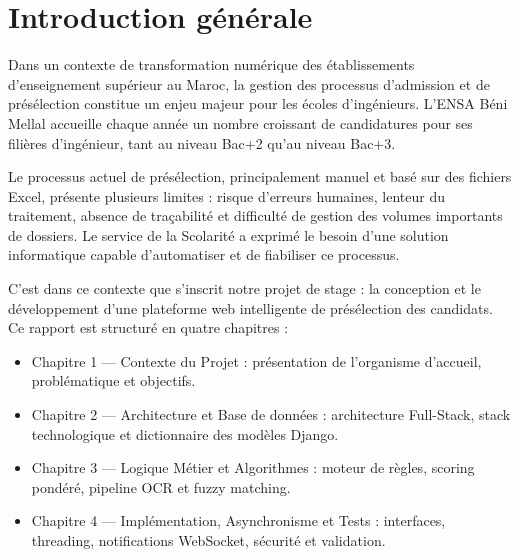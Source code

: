 \chapter*{Introduction générale}

Dans un contexte de transformation numérique des établissements d'enseignement supérieur au Maroc, la gestion des processus d'admission et de présélection constitue un enjeu majeur pour les écoles d'ingénieurs. L'ENSA Béni Mellal accueille chaque année un nombre croissant de candidatures pour ses filières d'ingénieur, tant au niveau Bac+2 qu'au niveau Bac+3.

Le processus actuel de présélection, principalement manuel et basé sur des fichiers Excel, présente plusieurs limites : risque d'erreurs humaines, lenteur du traitement, absence de traçabilité et difficulté de gestion des volumes importants de dossiers. Le service de la Scolarité a exprimé le besoin d'une solution informatique capable d'automatiser et de fiabiliser ce processus.

C'est dans ce contexte que s'inscrit notre projet de stage : la conception et le développement d'une plateforme web intelligente de présélection des candidats. Ce rapport est structuré en quatre chapitres :

\begin{itemize}
\item Chapitre 1 — Contexte du Projet : présentation de l'organisme d'accueil, problématique et objectifs.
\item Chapitre 2 — Architecture et Base de données : architecture Full-Stack, stack technologique et dictionnaire des modèles Django.
\item Chapitre 3 — Logique Métier et Algorithmes : moteur de règles, scoring pondéré, pipeline OCR et fuzzy matching.
\item Chapitre 4 — Implémentation, Asynchronisme et Tests : interfaces, threading, notifications WebSocket, sécurité et validation.
\end{itemize}

